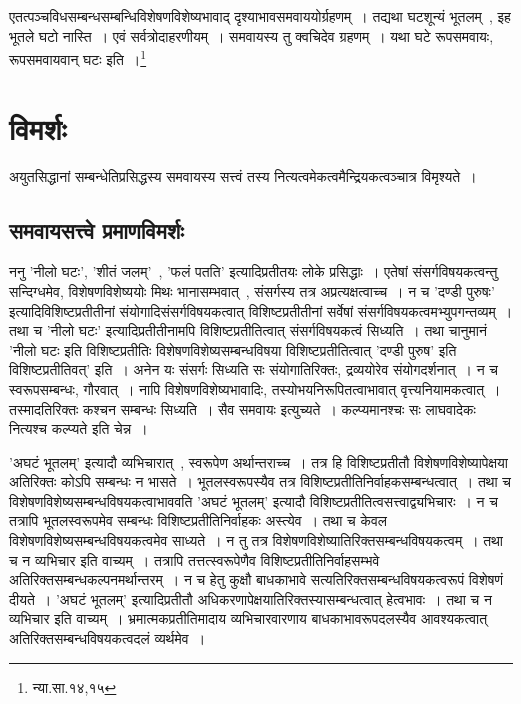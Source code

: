 	{\fontsize{11.7}{0}\selectfont\s एतत्पञ्चविधसम्बन्धसम्बन्धिविशेषणविशेष्यभावाद् दृश्याभावसमवाययोर्ग्रहणम्~। तद्यथा घटशून्यं भूतलम्~, इह भूतले घटो नास्ति~। एवं सर्वत्रोदाहरणीयम्~। समवायस्य तु क्वचिदेव ग्रहणम्~। यथा घटे रूपसमवायः, रूपसमवायवान् घटः इति~।\footnote{न्या.सा.१४,१५}}


	\section{विमर्शः}

	अयुतसिद्धानां सम्बन्धेतिप्रसिद्धस्य समवायस्य सत्त्वं तस्य नित्यत्वमेकत्वमैन्द्रियकत्वञ्चात्र विमृश्यते~।

		\subsection{समवायसत्त्वे प्रमाणविमर्शः}

		ननु 'नीलो घटः', 'शीतं जलम्'~, 'फलं पतति' इत्यादिप्रतीतयः लोके प्रसिद्धाः~। एतेषां संसर्गविषयकत्वन्तु सन्दिग्धमेव, विशेषणविशेष्ययोः मिथः भानासम्भवात्~, संसर्गस्य तत्र अप्रत्यक्षत्वाच्च~। न च 'दण्डी  पुरुषः' इत्यादिविशिष्टप्रतीतीनां संयोगादिसंसर्गविषयकत्वात् विशिष्टप्रतीतीनां सर्वेषां संसर्गविषयकत्वमभ्युपगन्तव्यम्~। तथा च 'नीलो घटः' इत्यादिप्रतीतीनामपि विशिष्टप्रतीतित्वात् संसर्गविषयकत्वं सिध्यति~। तथा चानुमानं 'नीलो घटः इति विशिष्टप्रतीतिः विशेषणविशेष्यसम्बन्धविषया विशिष्टप्रतीतित्वात् 'दण्डी पुरुष' इति विशिष्टप्रतीतिवत्' इति~। अनेन यः संसर्गः सिध्यति सः संयोगातिरिक्तः, द्रव्ययोरेव संयोगदर्शनात्~। न च स्वरूपसम्बन्धः, गौरवात्~। नापि विशेषणविशेष्यभावादिः, तस्योभयनिरूपितत्वाभावात् वृत्त्यनियामकत्वात्~। तस्मादतिरिक्तः कश्चन सम्बन्धः सिध्यति~। सैव समवायः इत्युच्यते~। कल्प्यमानश्चः सः लाघवादेकः नित्यश्च कल्प्यते इति चेन्न~। 

		'अघटं भूतलम्' इत्यादौ व्यभिचारात्~, स्वरूपेण अर्थान्तराच्च~। तत्र हि विशिष्टप्रतीतौ विशेषणविशेष्यापेक्षया अतिरिक्तः कोऽपि सम्बन्धः‌ न भासते~। भूतलस्वरूपस्यैव तत्र विशिष्टप्रतीतिनिर्वाहकसम्बन्धत्वात्~। तथा च विशेषणविशेष्यसम्बन्धविषयकत्वाभाववति 'अघटं भूतलम्' इत्यादौ विशिष्टप्रतीतित्वसत्त्वाद्व्यभिचारः~। न च तत्रापि भूतलस्वरूपमेव सम्बन्धः विशिष्टप्रतीतिनिर्वाहकः अस्त्येव~। तथा च केवल विशेषणविशेष्यसम्बन्धविषयकत्वमेव साध्यते~। न तु तत्र विशेषणविशेष्यातिरिक्तसम्बन्धविषयकत्वम्~। तथा च न व्यभिचार इति वाच्यम्~। तत्रापि तत्तत्स्वरूपेणैव विशिष्टप्रतीतिनिर्वाहसम्भवे अतिरिक्तसम्बन्धकल्पनमर्थान्तरम्~। न च हेतु कुक्षौ बाधकाभावे सत्यतिरिक्तसम्बन्धविषयकत्वरूपं विशेषणं दीयते~। 'अघटं भूतलम्' इत्यादिप्रतीतौ अधिकरणापेक्षयातिरिक्तस्यासम्बन्धत्वात् हेत्वभावः~। तथा च न व्यभिचार इति वाच्यम्~। भ्रमात्मकप्रतीतिमादाय व्यभिचारवारणाय बाधकाभावरूपदलस्यैव आवश्यकत्वात् अतिरिक्तसम्बन्धविषयकत्वदलं व्यर्थमेव~। 

